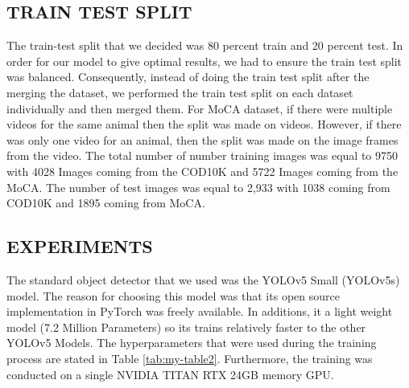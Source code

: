 \documentclass[conference]{IEEEtran}
\begin{document}
\subsection{TRAIN TEST SPLIT}
The train-test split that we decided was 80 percent train and 20 percent test. In order for our model to give optimal results, we had to ensure the train test split was balanced. Consequently, instead of doing the train test split after the merging the dataset, we performed the train test split on each dataset individually and then merged them. For MoCA dataset, if there were multiple videos for the same animal then the split was made on videos. However, if there was only one video for an animal, then the split was made on the image frames from the video. The total number of number training images was equal to 9750 with 4028 Images coming from the COD10K  and 5722 Images coming from the MoCA. The number of test images was equal to 2,933 with 1038 coming from COD10K and 1895 coming from MoCA.

\subsection{EXPERIMENTS}
The standard object detector that we used was the YOLOv5 Small (YOLOv5s) model. The reason for choosing this model was that its open source implementation in PyTorch was freely available. In additions, it a light weight model (7.2 Million Parameters) so its trains relatively faster to
the other YOLOv5 Models. The hyperparameters that were used during the training process are stated in Table \ref{tab:my-table2}. Furthermore, the training was conducted on a single NVIDIA TITAN RTX 24GB memory GPU.
\newpage
\begin{table}[h]
\centering
{}
\caption{Hyperparameters used during the training of the YOLOv5s Model}
\label{tab:my-table2}
\end{table}
\end{document}
